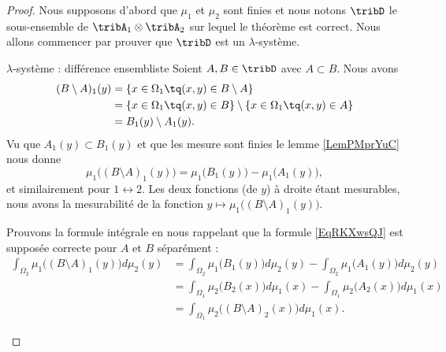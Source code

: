 \begin{proof}
    Nous supposons d'abord que \( \mu_1\) et \( \mu_2\) sont finies et nous notons \( \tribD\) le sous-ensemble de \( \tribA_1\otimes \tribA_2\) sur lequel le théorème est correct. Nous allons commencer par prouver que \( \tribD\) est un \( \lambda\)-système.

    \begin{subproof}
        \item[\( \lambda\)-système : différence ensembliste]
            Soient \( A,B\in\tribD\) avec \( A\subset B\). Nous avons
            \begin{subequations}
                \begin{align}
                    (B\setminus A)_1(y)&=\{ x\in \Omega_1\tq(x,y)\in B\setminus A \}\\
                    &=\{ x\in \Omega_1\tq(x,y)\in B\}\setminus\{ x\in \Omega_1\tq(x,y)\in  A \}\\
                    &=B_1(y)\setminus A_1(y).
                \end{align}
            \end{subequations}
            Vu que \( A_1(y)\subset B_1(y)\) et que les mesure sont finies le lemme \ref{LemPMprYuC} nous donne
            \begin{equation}
                \mu_1\big( (B\setminus A)_1(y) \big)=\mu_1\big( B_1(y) \big)-\mu_1\big( A_1(y) \big),
            \end{equation}
            et similairement pour \( 1\leftrightarrow 2\). Les deux fonctions (de \( y\)) à droite étant mesurables, nous avons la mesurabilité de la fonction \( y\mapsto \mu_1\big( (B\setminus A)_1(y) \big)\).

            Prouvons la formule intégrale en nous rappelant que la formule \eqref{EqRKXwsQJ} est supposée correcte pour \( A\) et \( B\) séparément :
            \begin{subequations}
                \begin{align}
                    \int_{\Omega_2}\mu_1\big( (B\setminus A)_1(y) \big)d\mu_2(y)&=\int_{\Omega_2}\mu_1\big( B_1(y) \big)d\mu_2(y)-\int_{\Omega_2}\mu_1\big( A_1(y) \big)d\mu_2(y)\\
                    &=\int_{\Omega_1}\mu_2\big( B_2(x) \big)d\mu_1(x)-\int_{\Omega_1}\mu_2\big( A_2(x) \big)d\mu_1(x)\\
                    &=\int_{\Omega_1}\mu_2\big( (B\setminus A)_2(x) \big)d\mu_1(x).
                \end{align}
            \end{subequations}
            

\end{subproof}
\end{proof}
